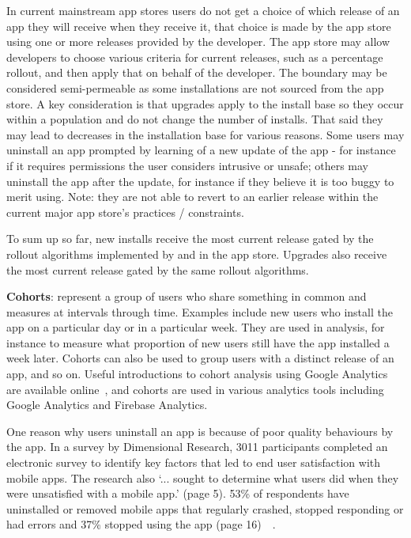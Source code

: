 In current mainstream app stores users do not get a choice of which release of an app they will receive when they receive it, that choice is made by the app store using one or more releases provided by the developer. The app store may allow developers to choose various criteria for current releases, such as a percentage rollout, and then apply that on behalf of the developer. The boundary may be considered semi-permeable as some installations are not sourced from the app store. A key consideration is that upgrades apply to the install base so they occur within a population and do not change the number of installs. That said they may lead to decreases in the installation base for various reasons. Some users may uninstall an app prompted by learning of a new update of the app - for instance if it requires permissions the user considers intrusive or unsafe; others may uninstall the app after the update, for instance if they believe it is too buggy to merit using. Note: they are not able to revert to an earlier release within the current major app store's practices / constraints. 

To sum up so far, new installs receive the most current release gated by the rollout algorithms implemented by and in the app store. Upgrades also receive the most current release gated by the same rollout algorithms.

\textbf{Cohorts}: represent a group of users who share something in common and measures at intervals through time. Examples include new users who install the app on a particular day or in a particular week. They are used in analysis, for instance to measure what proportion of new users still have the app installed a week later. Cohorts can also be used to group users with a distinct release of an app, and so on. Useful introductions to cohort analysis using Google Analytics are available online~, and cohorts are used in various analytics tools including Google Analytics and Firebase Analytics. 


One reason why users uninstall an app is because of poor quality behaviours by the app. In a survey by Dimensional Research, 3011 participants completed an electronic survey to identify key factors that led to end user satisfaction with mobile apps. The research also `... sought to determine what users did when they were unsatisfied with a mobile app.' (page 5). 
53\% of respondents have uninstalled or removed mobile apps that regularly crashed, stopped responding or had errors and 37\% stopped using the app (page 16)~~.

